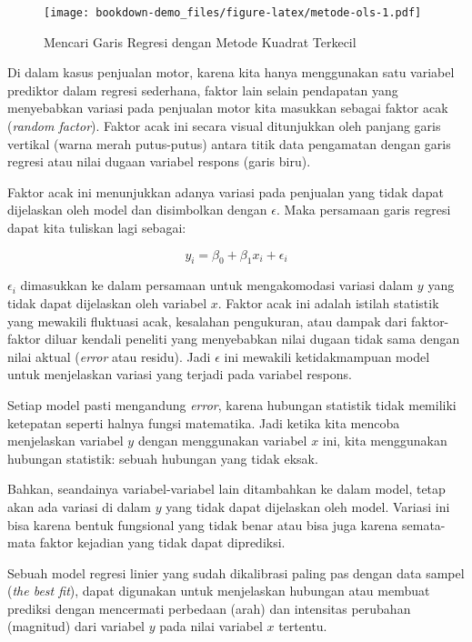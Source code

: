 \documentclass[
]{book}
\begin{document}
\begin{figure}
\centering
\texttt{[image: bookdown-demo\_files/figure-latex/metode-ols-1.pdf]}
\caption{\label{fig:metode-ols}Mencari Garis Regresi dengan Metode Kuadrat Terkecil}
\end{figure}

Di dalam kasus penjualan motor, karena kita hanya menggunakan satu variabel prediktor dalam regresi sederhana, faktor lain selain pendapatan yang menyebabkan variasi pada penjualan motor kita masukkan sebagai faktor acak (\emph{random factor}). Faktor acak ini secara visual ditunjukkan oleh panjang garis vertikal (warna merah putus-putus) antara titik data pengamatan dengan garis regresi atau nilai dugaan variabel respons (garis biru).

Faktor acak ini menunjukkan adanya variasi pada penjualan yang
tidak dapat dijelaskan oleh model dan disimbolkan dengan \(\epsilon\).
Maka persamaan garis regresi dapat kita tuliskan lagi sebagai:

\begin{equation} 
y_i=\beta_0 + \beta_1x_i + \epsilon_i
\label{eq:persamaan-witherror}
\end{equation}

\(\epsilon_i\) dimasukkan ke dalam persamaan untuk mengakomodasi variasi dalam \(y\) yang tidak dapat dijelaskan oleh variabel \(x\). Faktor acak ini adalah istilah
statistik yang mewakili fluktuasi acak, kesalahan pengukuran, atau
dampak dari faktor-faktor diluar kendali peneliti \citep{faraway2016a} yang menyebabkan nilai dugaan tidak sama dengan nilai aktual (\emph{error} atau residu). Jadi
\(\epsilon\) ini mewakili ketidakmampuan model untuk menjelaskan variasi
yang terjadi pada variabel respons.

Setiap model pasti mengandung \emph{error}, karena hubungan statistik tidak
memiliki ketepatan seperti halnya fungsi matematika. Jadi ketika kita
mencoba menjelaskan variabel \(y\) dengan menggunakan variabel \(x\) ini,
kita menggunakan hubungan statistik: sebuah hubungan yang tidak eksak.

Bahkan, seandainya variabel-variabel lain ditambahkan ke dalam model,
tetap akan ada variasi di dalam \(y\) yang tidak dapat dijelaskan oleh
model. Variasi ini bisa karena bentuk fungsional yang tidak benar atau
bisa juga karena semata-mata faktor kejadian yang tidak dapat
diprediksi.

Sebuah model regresi linier yang sudah dikalibrasi paling pas dengan
data sampel (\emph{the best fit}), dapat digunakan untuk menjelaskan hubungan
atau membuat prediksi dengan mencermati perbedaan (arah) dan intensitas
perubahan (magnitud) dari variabel \(y\) pada nilai variabel \(x\) tertentu.
\end{document}

